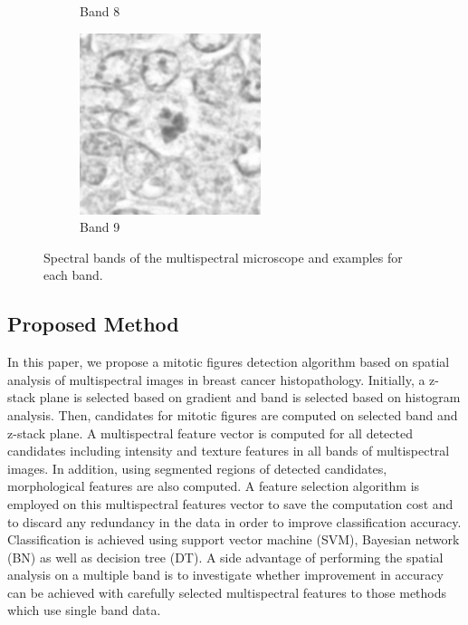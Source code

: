 \documentclass[10pt,twocolumn,letterpaper]{article}
\begin{document}
\begin{figure}[t]
\begin{subfigure}[b]{0.11\textwidth}
		\caption*{Band 8}
	\end{subfigure}
	\begin{subfigure}[b]{0.11\textwidth}
		\centering
		\includegraphics[width=\textwidth]{img/M03_00a_0908_m1.png}
		\caption*{Band 9}
	\end{subfigure}
	\caption{Spectral bands of the multispectral microscope and examples for each band.}
	\label{fig:spectral_bands}
\end{figure}
\subsection{Proposed Method}
In this paper, we propose a mitotic figures detection algorithm based on spatial analysis of multispectral images in breast cancer histopathology. Initially, a z-stack plane is selected based on gradient and band is selected based on histogram analysis. Then, candidates for mitotic figures  are computed on selected band and z-stack plane. A multispectral feature vector is computed for all detected candidates including intensity and texture features in all bands of multispectral images. In addition, using segmented regions of detected candidates, morphological features are also computed. A feature selection algorithm is employed on this multispectral features vector to save the computation cost and to discard any redundancy in the data in order to improve classification accuracy. Classification is achieved using support vector machine (SVM), Bayesian network (BN) as well as decision tree (DT). A side advantage of performing the spatial analysis on a multiple band is to investigate whether improvement in accuracy can be achieved with carefully selected multispectral features to those methods \cite{masood2009,wu2009,wu2012} which use single band data.
\end{document}
